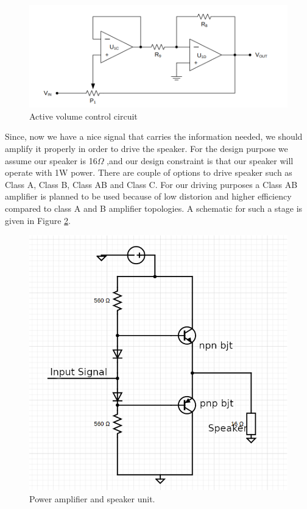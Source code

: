 \documentclass[a4paper,10pt]{IEEEtran}
\begin{document}
\begin{figure}[htbp!] %
    \centering
    \includegraphics[width = 0.75\linewidth]{baxandall_volume_control.png}
    \caption{Active volume control circuit}
    \label{Baxandall}    
\end{figure} 
Since, now we have a nice signal that carries the information needed, we should amplify it properly in order to drive the speaker. For the design purpose we assume our speaker is 16\(\Omega\) ,and our design constraint is that our speaker will operate with 1W power. There are couple of options to drive speaker such as Class A, Class B, Class AB and Class C. For our driving purposes a Class AB amplifier is planned to be used because of low distorion and higher efficiency compared to class A and B amplifier topologies. A schematic for such a stage is given in Figure \ref*{power_amp_sch}.
\begin{figure}[htbp!]
    \centering
    \includegraphics[height = 0.75\linewidth]{power_amp.png}
    \caption{Power amplifier and speaker unit.}
    \label{power_amp_sch}    
\end{figure} 
\vspace{-0.5cm}
\end{document}
